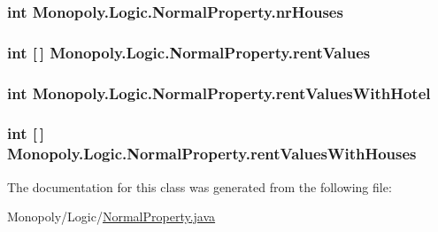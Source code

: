 \subsubsection[{\texorpdfstring{nr\+Houses}{nrHouses}}]{\setlength{\rightskip}{0pt plus 5cm}int Monopoly.\+Logic.\+Normal\+Property.\+nr\+Houses\hspace{0.3cm}{\ttfamily [private]}}\hypertarget{class_monopoly_1_1_logic_1_1_normal_property_a7e951cc0cdfc94ab74fffa59d8bd32db}{}\label{class_monopoly_1_1_logic_1_1_normal_property_a7e951cc0cdfc94ab74fffa59d8bd32db}
\subsubsection[{\texorpdfstring{rent\+Values}{rentValues}}]{\setlength{\rightskip}{0pt plus 5cm}int \mbox{[}$\,$\mbox{]} Monopoly.\+Logic.\+Normal\+Property.\+rent\+Values\hspace{0.3cm}{\ttfamily [private]}}\hypertarget{class_monopoly_1_1_logic_1_1_normal_property_aae8931ab4d7d9ca32d507ca34141e48d}{}\label{class_monopoly_1_1_logic_1_1_normal_property_aae8931ab4d7d9ca32d507ca34141e48d}
\subsubsection[{\texorpdfstring{rent\+Values\+With\+Hotel}{rentValuesWithHotel}}]{\setlength{\rightskip}{0pt plus 5cm}int Monopoly.\+Logic.\+Normal\+Property.\+rent\+Values\+With\+Hotel\hspace{0.3cm}{\ttfamily [private]}}\hypertarget{class_monopoly_1_1_logic_1_1_normal_property_af1d8fcccf72faa5a718594967213ba55}{}\label{class_monopoly_1_1_logic_1_1_normal_property_af1d8fcccf72faa5a718594967213ba55}
\subsubsection[{\texorpdfstring{rent\+Values\+With\+Houses}{rentValuesWithHouses}}]{\setlength{\rightskip}{0pt plus 5cm}int \mbox{[}$\,$\mbox{]} Monopoly.\+Logic.\+Normal\+Property.\+rent\+Values\+With\+Houses\hspace{0.3cm}{\ttfamily [private]}}\hypertarget{class_monopoly_1_1_logic_1_1_normal_property_a918c6693fd0638db23698322ae3fdad3}{}\label{class_monopoly_1_1_logic_1_1_normal_property_a918c6693fd0638db23698322ae3fdad3}


The documentation for this class was generated from the following file\+:\begin{DoxyCompactItemize}
\item 
Monopoly/\+Logic/\hyperlink{_normal_property_8java}{Normal\+Property.\+java}\end{DoxyCompactItemize}
